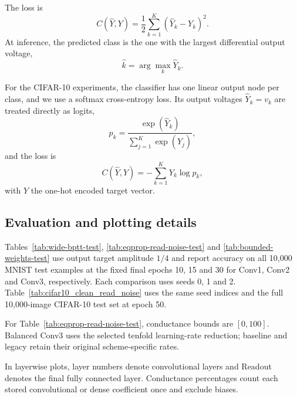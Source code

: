 \documentclass{article}
\begin{document}
The loss is
\begin{equation}
    C(\hat{Y},Y)
    =
    \frac{1}{2}
    \sum_{k=1}^{K}
    \left(\hat{Y}_k-Y_k\right)^2 .
\end{equation}
At inference, the predicted class is the one with the largest differential
output voltage,
\begin{equation}
    \hat{k}=\arg\max_k \hat{Y}_k .
\end{equation}

For the CIFAR-10 experiments, the classifier has one linear output node per
class, and we use a softmax cross-entropy loss. Its output voltages
$\hat{Y}_k=v_k$ are treated directly as logits,
\begin{equation}
    p_k =
    \frac{\exp(\hat{Y}_k)}
    {\sum_{j=1}^{K}\exp(\hat{Y}_j)},
\end{equation}
and the loss is
\begin{equation}
    C(\hat{Y},Y)
    =
    -\sum_{k=1}^{K} Y_k \log p_k ,
\end{equation}
with $Y$ the one-hot encoded target vector.

\subsection{Evaluation and plotting details}
\label{sec:supp_evaluation_details}

Tables~\ref{tab:wide-bptt-test}, \ref{tab:eqprop-read-noise-test} and
\ref{tab:bounded-weights-test} use output target amplitude $1/4$ and report
accuracy on all 10,000 MNIST test examples at the fixed final epochs
10, 15 and 30 for Conv1, Conv2 and Conv3, respectively. Each comparison uses
seeds 0, 1 and 2. Table~\ref{tab:cifar10_clean_read_noise} uses the same seed
indices and the full 10,000-image CIFAR-10 test set at epoch 50.

For Table~\ref{tab:eqprop-read-noise-test}, conductance bounds are $[0,100]$. Balanced Conv3
uses the selected tenfold learning-rate reduction; baseline and legacy
retain their original scheme-specific rates.

In layerwise plots, layer numbers denote convolutional layers and Readout
denotes the final fully connected layer. Conductance percentages count each
stored convolutional or dense coefficient once and exclude biases.
\end{document}
